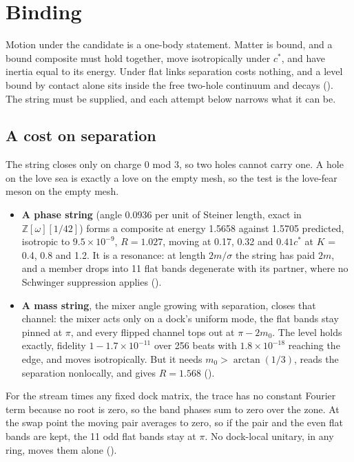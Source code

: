 \section{Binding}
\label{sec:binding}

Motion under the candidate is a one-body statement. Matter is bound, and a bound composite must hold together, move
isotropically under $c^*$, and have inertia equal to its energy. Under flat links separation costs nothing, and a level
bound by contact alone sits inside the free two-hole continuum and decays (). The string must be
supplied, and each attempt below narrows what it can be.

\subsection{A cost on separation}

The string closes only on charge 0 mod 3, so two holes cannot carry one. A hole on the love sea is exactly a love on
the empty mesh, so the test is the love-fear meson on the empty mesh.
\begin{itemize}
\item \textbf{A phase string} (angle 0.0936 per unit of Steiner length, exact in $\mathbb{Z}[\omega][1/42]$) forms a
composite at energy 1.5658 against 1.5705 predicted, isotropic to $9.5 \times 10^{-9}$, $R = 1.027$, moving at 0.17,
0.32 and $0.41c^*$ at $K$ = 0.4, 0.8 and 1.2. It is a resonance: at length $2m/\sigma$ the string has paid $2m$, and a
member drops into 11 flat bands degenerate with its partner, where no Schwinger suppression applies
\cite{kurzynski2008} ().
\item \textbf{A mass string}, the mixer angle growing with separation, closes that channel: the mixer acts only on a
dock's uniform mode, the flat bands stay pinned at $\pi$, and every flipped channel tops out at $\pi - 2m_0$. The level
holds exactly, fidelity $1 - 1.7 \times 10^{-11}$ over 256 beats with $1.8 \times 10^{-18}$ reaching the edge, and moves
isotropically. But it needs $m_0 > \arctan(1/3)$, reads the separation nonlocally, and gives $R = 1.568$
().
\end{itemize}

\begin{theorem}
For the stream times any fixed dock matrix, the trace has no constant Fourier term because no root is zero, so the
band phases sum to zero over the zone. At the swap point the moving pair averages to zero, so if the pair and the even
flat bands are kept, the 11 odd flat bands stay at $\pi$. No dock-local unitary, in any ring, moves them alone
().
\end{theorem}

